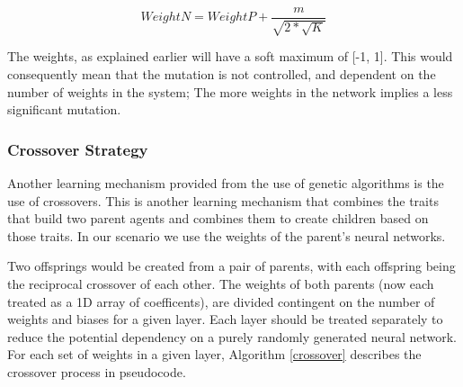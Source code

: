 \documentclass[12pt,a4paper]{article}
\begin{document}
    \begin{equation} \label{mutation}
         WeightN = WeightP + \frac{m}{\sqrt{2 * \sqrt{K} }}
    \end{equation}

    The weights, as explained earlier will have a soft maximum of [-1, 1]. This  would consequently mean that the mutation is not controlled, and dependent on the number of weights in the system; The more weights in the network implies a less significant mutation.

\subsubsection{Crossover Strategy}

    Another learning mechanism provided from the use of genetic algorithms is the use of crossovers. This is another learning mechanism that combines the traits that build two parent agents and combines them to create children based on those traits. In our scenario we use the weights of the parent's neural networks.

    Two offsprings would be created from a pair of parents, with each offspring being the reciprocal crossover of each other. The weights of both parents (now each treated as a 1D array of coefficents), are divided contingent on the number of weights and biases for a given layer. Each layer should be treated separately to reduce the potential dependency on a purely randomly generated neural network. For each set of weights in a given layer, Algorithm \ref{crossover} describes the crossover process in pseudocode.

        
\end{document}
